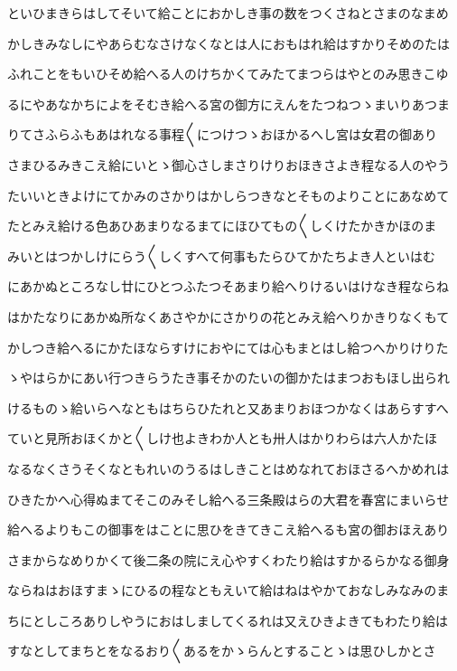 \documentclass[a4paper,11pt,landscape]{ltjtarticle}
\begin{document}
といひまきらはしてそいて給ことにおかしき事の数をつくさねとさまのなまめ
\par\medskip
かしきみなしにやあらむなさけなくなとは人におもはれ給はすかりそめのたは
\par\medskip
ふれことをもいひそめ給へる人のけちかくてみたてまつらはやとのみ思きこゆ
\par\medskip
るにやあなかちによをそむき給へる宮の御方にえんをたつねつゝまいりあつま
\par\medskip
りてさふらふもあはれなる事程〱につけつゝおほかるへし宮は女君の御あり
\par\medskip
さまひるみきこえ給にいとゝ御心さしまさりけりおほきさよき程なる人のやう
\par\medskip
たいいときよけにてかみのさかりはかしらつきなとそものよりことにあなめて
\par\medskip
たとみえ給ける色あひあまりなるまてにほひてもの〱しくけたかきかほのま
\par\medskip
みいとはつかしけにらう〱しくすへて何事もたらひてかたちよき人といはむ
\par\medskip
にあかぬところなし廿にひとつふたつそあまり給へりけるいはけなき程ならね
\par\medskip
はかたなりにあかぬ所なくあさやかにさかりの花とみえ給へりかきりなくもて
\par\medskip
かしつき給へるにかたほならすけにおやにては心もまとはし給つへかりけりた
\par\medskip
ゝやはらかにあい行つきらうたき事そかのたいの御かたはまつおもほし出られ
\par\medskip
けるものゝ給いらへなともはちらひたれと又あまりおほつかなくはあらすすへ
\par\medskip
ていと見所おほくかと〱しけ也よきわか人とも卅人はかりわらは六人かたほ
\par\medskip
なるなくさうそくなともれいのうるはしきことはめなれておほさるへかめれは
\par\medskip
ひきたかへ心得ぬまてそこのみそし給へる三条殿はらの大君を春宮にまいらせ
\par\medskip
給へるよりもこの御事をはことに思ひをきてきこえ給へるも宮の御おほえあり
\par\medskip
さまからなめりかくて後二条の院にえ心やすくわたり給はすかるらかなる御身
\par\medskip
ならねはおほすまゝにひるの程なともえいて給はねはやかておなしみなみのま
\par\medskip
ちにとしころありしやうにおはしましてくるれは又えひきよきてもわたり給は
\par\medskip
すなとしてまちとをなるおり〱あるをかゝらんとすることゝは思ひしかとさ
\end{document}

